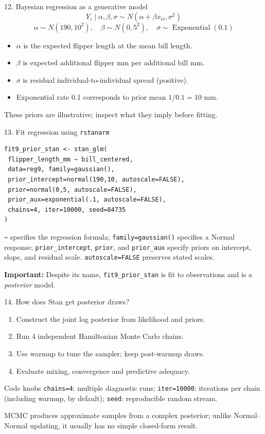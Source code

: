 \documentclass[aspectratio=43,10pt]{beamer}
\newcommand{\take}[1]{\begin{block}{}#1\end{block}}
\begin{document}
\begin{frame}{12. Bayesian regression as a generative model}
\[Y_i\mid\alpha,\beta,\sigma\sim N(\alpha+\beta x_{ci},\sigma^2)\]
\[\alpha\sim N(190,10^2),\quad\beta\sim N(0,5^2),\quad\sigma\sim\operatorname{Exponential}(0.1)\]
\begin{itemize}\item \(\alpha\) is the expected flipper length at the mean bill length.
\item \(\beta\) is expected additional flipper mm per additional bill mm.
\item \(\sigma\) is residual individual-to-individual spread (positive).
\item Exponential rate 0.1 corresponds to prior mean \(1/0.1=10\) mm.
\end{itemize}
\take{These priors are illustrative; inspect what they imply before fitting.}
\end{frame}

\begin{frame}[fragile]{13. Fit regression using \texttt{rstanarm}}
\begin{lstlisting}
fit9_prior_stan <- stan_glm(
 flipper_length_mm ~ bill_centered,
 data=reg9, family=gaussian(),
 prior_intercept=normal(190,10, autoscale=FALSE),
 prior=normal(0,5, autoscale=FALSE),
 prior_aux=exponential(.1, autoscale=FALSE),
 chains=4, iter=10000, seed=84735
)
\end{lstlisting}
\small \texttt{\~} specifies the regression formula; \texttt{family=gaussian()} specifies a Normal response; \texttt{prior\_intercept}, \texttt{prior}, and \texttt{prior\_aux} specify priors on intercept, slope, and residual scale. \texttt{autoscale=FALSE} preserves stated scales.\par
\textbf{Important:} Despite its name, \texttt{fit9\_prior\_stan} is fit to observations and is a \emph{posterior} model.
\end{frame}

\begin{frame}{14. How does Stan get posterior draws?}
\begin{enumerate}\item Construct the joint log posterior from likelihood and priors.
\item Run 4 independent Hamiltonian Monte Carlo chains.
\item Use warmup to tune the sampler; keep post-warmup draws.
\item Evaluate mixing, convergence and predictive adequacy.
\end{enumerate}
\begin{block}{Code knobs}
\texttt{chains=4}: multiple diagnostic runs; \texttt{iter=10000}: iterations per chain (including warmup, by default); \texttt{seed}: reproducible random stream.
\end{block}
\small MCMC produces approximate samples from a complex posterior; unlike Normal--Normal updating, it usually has no simple closed-form result.
\end{frame}
\end{document}
